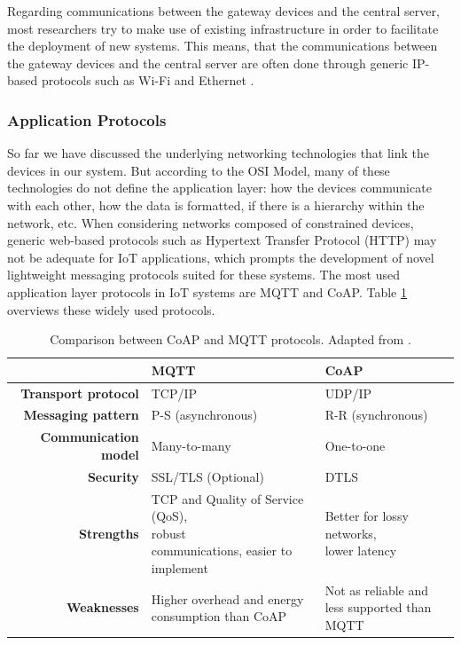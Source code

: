 Regarding communications between the gateway devices and the central server, most researchers try to make use of existing infrastructure in order to facilitate the deployment of new systems. This means, that the communications between the gateway devices and the central server are often done through generic IP-based protocols such as Wi-Fi and Ethernet \cite{Adame2018, Fuhrer2006, Wu2020, Catarinucci2015}. \bigskip

\subsubsection{Application Protocols}

So far we have discussed the underlying networking technologies that link the devices in our system. But according to the OSI Model, many of these technologies do not define the application layer: how the devices communicate with each other, how the data is formatted, if there is a hierarchy within the network, etc. When considering networks composed of constrained devices, generic web-based protocols such as Hypertext Transfer Protocol (HTTP) may not be adequate for \acs{IoT} applications, which prompts the development of novel lightweight messaging protocols suited for these systems. The most used application layer protocols in \acs{IoT} systems are \acf{MQTT} and \acf{CoAP}. Table \ref{tab:comparsion-applicationprotocols} overviews these widely used protocols. \bigskip

\renewcommand{\arraystretch}{1.5}
\begin{table}[H]
    \centering
    \begin{tabular}{r|l|l}
        & \textbf{\acs{MQTT}}& \textbf{\acs{CoAP}}  \\ \hline
        \textbf{Transport protocol} & TCP/IP & UDP/IP \\
        \textbf{Messaging pattern} & P-S (asynchronous) & R-R (synchronous) \\
        \textbf{Communication model} & Many-to-many & One-to-one \\
        \textbf{Security} & SSL/TLS (Optional) & DTLS \\
        \textbf{Strengths} & \makecell{TCP and Quality of Service (QoS),\\ robust \\communications, easier to implement } & \makecell{Better for lossy networks,\\ lower latency} \\
        \textbf{Weaknesses} & \makecell{Higher overhead and energy\\ consumption than \acs{CoAP}} & \makecell{Not as reliable and \\less supported than MQTT} \\
    \end{tabular}
    \caption[Comparison between \acs{CoAP} and \acs{MQTT} protocols.]{Comparison between \acs{CoAP} and \acs{MQTT} protocols. Adapted from \cite{10.5555/3161403}.}
    \label{tab:comparsion-applicationprotocols}
\end{table} 
\renewcommand{\arraystretch}{1}


